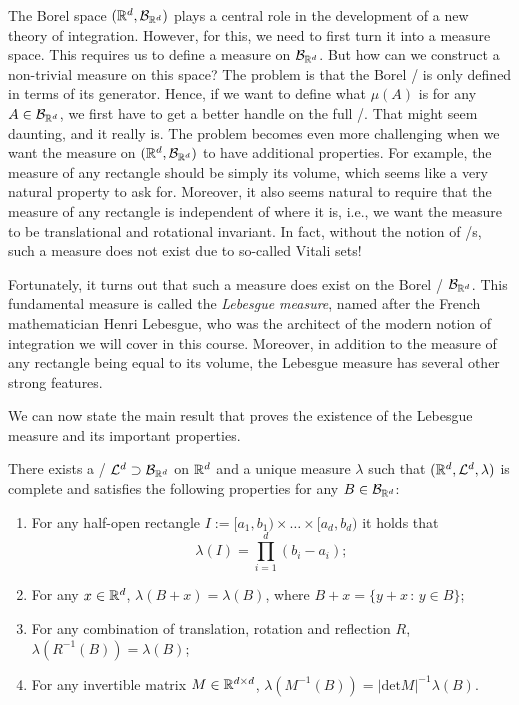 The Borel space $(\mathbb R^d, \mathcal B_{\mathbb R^d})$ plays a central role in the development of a new theory of integration. However, for this, we need to first turn it into a measure space. This requires us to define a measure on $\mathcal B_{\mathbb R^d}$. But how can we construct a non-trivial measure on this space? The problem is that the Borel \sigalg/ is only defined in terms of its generator. Hence, if we want to define what $\mu(A)$ is for any $A \in \mathcal B_{\mathbb R^d}$, we first have to get a better handle on the full \sigalg/. That might seem daunting, and it really is. The problem becomes even more challenging when we want the measure on $(\mathbb R^d, \mathcal B_{\mathbb R^d})$ to have additional properties. For example, the measure of any rectangle should be simply its volume, which seems like a very natural property to ask for. Moreover, it also seems natural to require that the measure of any rectangle is independent of where it is, i.e., we want the measure to be translational and rotational invariant. In fact, without the notion of \sigalg/s, such a measure does not exist due to so-called Vitali sets!  

Fortunately, it turns out that such a measure does exist on the Borel \sigalg/ $\mathcal B_{\mathbb R^d}$. This fundamental measure is called the \emph{Lebesgue measure}, named after the French mathematician Henri Lebesgue, who was the architect of the modern notion of integration we will cover in this course. Moreover, in addition to the measure of any rectangle being equal to its volume, the Lebesgue measure has several other strong features. 


We can now state the main result that proves the existence of the Lebesgue measure and its important properties. 

\begin{theorem}\label{thm:lebesgue_measure}
There exists a \sigalg/ $\mathcal L^d \supset \mathcal B_{\mathbb R^d}$ on $\mathbb R^d$ and a unique measure $\lambda$ such that $(\mathbb R^d, \mathcal L^d, \lambda)$ is complete and satisfies the following properties for any $B \in \mathcal B_{\mathbb R^d}$:
\begin{enumerate}
\item For any half-open rectangle $I := [a_1, b_1) \times \dots \times [a_d, b_d)$ it holds that 
	\[
		\lambda(I) = \prod_{i = 1}^d (b_i-a_i);
	\]
\item For any $x \in \mathbb R^d$, $\lambda(B+x) = \lambda(B)$, where $B + x = \{y+x \, : \, y \in B\}$;
\item For any combination of translation, rotation and reflection $R$, $\lambda(R^{-1}(B)) = \lambda(B)$;
\item For any invertible matrix $M \in \mathbb R^{d \times d}$, $\lambda(M^{-1}(B)) = |\mathrm{det} M|^{-1} \lambda(B)$.
\end{enumerate}
\end{theorem}

